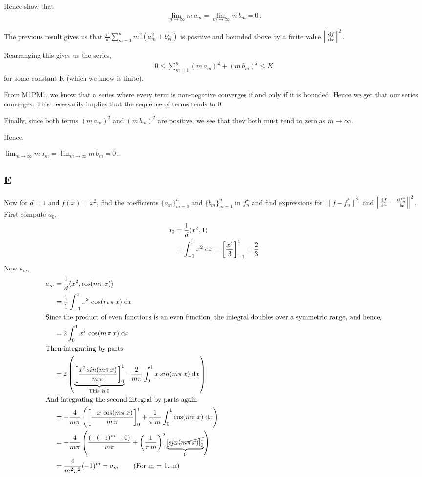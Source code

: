 \documentclass[12pt]{article}
\newcommand{\dx}{\; {\rm d}x}
\newcommand{\dfdx}{\frac{{\rm d}f}{{\rm d}x}}
\newcommand{\dfstardx}{\frac{{\rm d}f_n^*}{{\rm d}x}}
\newcommand{\inprod}[2]{\langle #1, #2 \rangle}
\newcommand{\norm}[1]{\left\|#1\right\|}
\newcommand{\integ}[1]{\int_{-#1}^#1}
\newcommand{\intzero}[1]{\int_{0}^#1}
\begin{document}
Hence show that
\begin{align*}
\lim_{m \to \infty} m\,a_m  = \lim_{m \to \infty} m\,b_m =0\,.   
\end{align*}

The previous result gives us that $\frac{\pi^2}{d} \sum_{m=1}^n m^2 (a_m^2 + b_m^2)$ is positive and bounded above by a finite value $\norm{\dfdx}^2$.

Rearranging this gives us the series,
\begin{align}
	0 \leq \sum_{m=1}^n (m\,a_m)^2 + (m\,b_m)^2 \leq K
\end{align}
for some constant K (which we know is finite).

From M1PM1, we know that a series where every term is non-negative converges if and only if it is bounded. Hence we get that our series converges. This necessarily implies that the sequence of terms tends to 0.

Finally, since both terms $(m\,a_m)^2$ and $(m\,b_m)^2$ are positive, we see that they both must tend to zero as $m \rightarrow \infty$.

Hence, 

$\lim_{m \to \infty} m\,a_m  = \lim_{m \to \infty} m\,b_m =0\,.  $\\

\subsection{E}

Now for $d=1$ and $f(x)=x^2$, 
find the coefficients $\{a_m\}_{m=0}^n$ and $\{b_m\}_{m=1}^n$
in $f_n^\star$ and find expressions for $\| f - f_n^* \|^2$
and $\left\| \dfdx - \dfstardx \right\|^2$.\\
First compute $a_0$,
\begin{align}
	a_0 &= \frac{1}{d}\inprod{x^2}{1}\\
		&= \integ{1} x^2 \dx = \left[\frac{x^3}{3}\right]_{-1}^{1} = \frac{2}{3} 
\end{align}
Now $a_m$,
\begin{align}
	a_m &= \frac{1}{d}\inprod{x^2}{\cos(m\pi\,x)}\\
		&= \frac{1}{1} \integ{1} x^2\,\cos(m\,\pi\,x) \dx\\
	 	\intertext{Since the product of even functions is an even function, the integral doubles over a symmetric range, and hence,}
	 	&= 2 \intzero{1} x^2\,\cos(m\,\pi\,x) \dx\\
	 	\intertext{Then integrating by parts}
	 	&= 2 \left(\underbrace{\left[\frac{x^2\,sin(m\pi\,x)}{m\,\pi}\right]_0^1}_{\text{This is 0}} -
	 					 \frac{2}{m\pi} \intzero{1} x\,sin(m\pi\,x) \dx\right)\\
	 	\intertext{And integrating the second integral by parts again}
	 	&= -\frac{4}{m\pi} \left(\left[\frac{-x\,\cos(m\pi\,x)}{m\,\pi}\right]_0^1 +
	 					 \frac{1}{\pi\,m} \intzero{1} \cos(m\pi\,x) \dx\right)\\
	 	&= -\frac{4}{m\pi} \left(\frac{(-(-1)^m - 0)}{m\pi} +
	 					 \left(\frac{1}{\pi\,m}\right)^2 \underbrace{\cancel{\left[sin(m\pi\,x)\right]_0^1}}_{0}\right)\\
	 	&= \frac{4}{m^2\pi^2} (-1)^m = a_m\, \tag{For m = 1...n}
\end{align}
\end{document}
